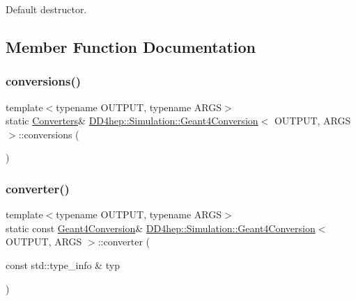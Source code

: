 Default destructor. 



\subsection{Member Function Documentation}
\hypertarget{class_d_d4hep_1_1_simulation_1_1_geant4_conversion_ab9cbccbc85006e7c05a09e89b9b7a93f}{}\label{class_d_d4hep_1_1_simulation_1_1_geant4_conversion_ab9cbccbc85006e7c05a09e89b9b7a93f} 
\subsubsection{\texorpdfstring{conversions()}{conversions()}}
{\footnotesize\ttfamily template$<$typename O\+U\+T\+P\+UT, typename A\+R\+GS$>$ \\
static \hyperlink{class_d_d4hep_1_1_simulation_1_1_geant4_conversion_a1e6c074730135cc207cbd8d8030a189f}{Converters}\& \hyperlink{class_d_d4hep_1_1_simulation_1_1_geant4_conversion}{D\+D4hep\+::\+Simulation\+::\+Geant4\+Conversion}$<$ O\+U\+T\+P\+UT, A\+R\+GS $>$\+::conversions (\begin{DoxyParamCaption}{ }\end{DoxyParamCaption})\hspace{0.3cm}{\ttfamily [static]}}

\hypertarget{class_d_d4hep_1_1_simulation_1_1_geant4_conversion_ae3cf2cfa3d9381220a8865943a496ff5}{}\label{class_d_d4hep_1_1_simulation_1_1_geant4_conversion_ae3cf2cfa3d9381220a8865943a496ff5} 
\subsubsection{\texorpdfstring{converter()}{converter()}}
{\footnotesize\ttfamily template$<$typename O\+U\+T\+P\+UT, typename A\+R\+GS$>$ \\
static const \hyperlink{class_d_d4hep_1_1_simulation_1_1_geant4_conversion}{Geant4\+Conversion}\& \hyperlink{class_d_d4hep_1_1_simulation_1_1_geant4_conversion}{D\+D4hep\+::\+Simulation\+::\+Geant4\+Conversion}$<$ O\+U\+T\+P\+UT, A\+R\+GS $>$\+::converter (\begin{DoxyParamCaption}\item[{const std\+::type\+\_\+info \&}]{typ }\end{DoxyParamCaption})\hspace{0.3cm}{\ttfamily [static]}}


